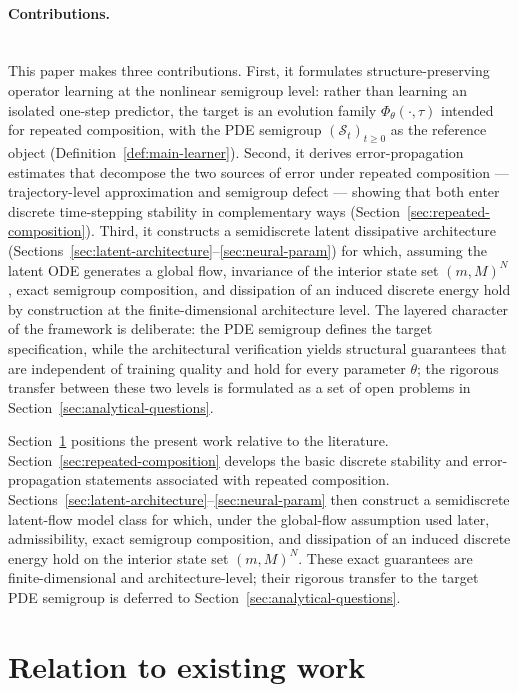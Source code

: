 \documentclass[11pt]{article}
\newcommand{\cS}{\mathcal{S}}
\begin{document}
\paragraph{Contributions.}\leavevmode\\
This paper makes three contributions.
First, it formulates structure-preserving operator learning at the nonlinear semigroup level: rather than learning an isolated one-step predictor, the target is an evolution family \(\Phi_{\theta}(\cdot,\tau)\) intended for repeated composition, with the PDE semigroup \((\cS_t)_{t\ge 0}\) as the reference object (Definition~\ref{def:main-learner}).
Second, it derives error-propagation estimates that decompose the two sources of error under repeated composition — trajectory-level approximation and semigroup defect — showing that both enter discrete time-stepping stability in complementary ways (Section~\ref{sec:repeated-composition}).
Third, it constructs a semidiscrete latent dissipative architecture (Sections~\ref{sec:latent-architecture}--\ref{sec:neural-param}) for which, assuming the latent ODE generates a global flow, invariance of the interior state set $(m,M)^N$, exact semigroup composition, and dissipation of an induced discrete energy hold by construction at the finite-dimensional architecture level.
The layered character of the framework is deliberate: the PDE semigroup defines the target specification, while the architectural verification yields structural guarantees that are independent of training quality and hold for every parameter $\theta$; the rigorous transfer between these two levels is formulated as a set of open problems in Section~\ref{sec:analytical-questions}.

Section~\ref{sec:related-work} positions the present work relative to the literature. Section~\ref{sec:repeated-composition} develops the basic discrete stability and error-propagation statements associated with repeated composition. Sections~\ref{sec:latent-architecture}--\ref{sec:neural-param} then construct a semidiscrete latent-flow model class for which, under the global-flow assumption used later, admissibility, exact semigroup composition, and dissipation of an induced discrete energy hold on the interior state set $(m,M)^N$. These exact guarantees are finite-dimensional and architecture-level; their rigorous transfer to the target PDE semigroup is deferred to Section~\ref{sec:analytical-questions}.

\section{Relation to existing work}\label{sec:related-work}
\end{document}
